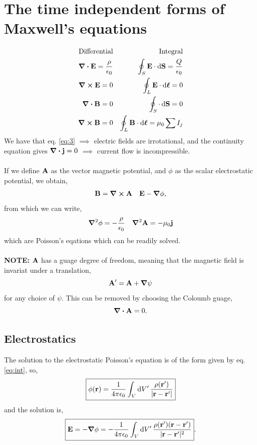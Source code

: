 \documentclass{book}
\begin{document}
\section{The time independent forms of Maxwell's equations}
\begin{align}
	\text{Differential} && \text{Integral}\\
	\div{\vb{E}} = \frac{\rho}{\epsilon_0} && \oint_S\vb{E}\cdot\dd{\vb{S}} = \frac{Q}{\epsilon_0} \label{eq:1} \\
	\curl{\vb{E}} = 0 && \oint_L \vb{E}\cdot\dd{\vb*{\ell}} = 0 \label{eq:2}\\
	\div{\vb{B}} = 0 && \oint_S \cdot\dd{\vb{S}} = 0 \label{eq:3}\\
	\curl{\vb{B}} = 0 && \oint_L\vb{B}\cdot\dd{\vb*{\ell}} = \mu_0 \sum I_j \label{eq:4}
\end{align}
We have that eq. \eqref{eq:3} $\implies$ electric fields are irrotational, and the continuity equation gives $\div{\vb{j}} = 0$ $\implies$ current flow is incompressible.
\\\\
If we define $\vb{A}$ as the vector magnetic potential, and $\phi$ as the scalar electrostatic potential, we obtain,
\begin{align}
	\vb{B} = \curl{\vb{A}} && \vb{E} - \grad \phi, \label{eq:potentials}
\end{align}
from which we can write,
\begin{align}
	\grad^2 \phi = -\frac{\rho}{\epsilon_0} && \grad^2 \vb{A} = -\mu_0\vb{j}
\end{align}
which are Poisson's eqations which can be readily solved.
\\\\
\textbf{NOTE:} $\vb{A}$ has a guage degree of freedom, meaning that the magnetic field is invariat under a translation,
\begin{equation}
	\vb{A}' = \vb{A} + \grad \psi
\end{equation}
for any choice of $\psi$. This can be removed by choosing the Coloumb guage,
\begin{equation}
	\div{\vb{A}} = 0.
\end{equation}
\subsection{Electrostatics}
The solution to the electrostatic Poisson's equation is of the form given by eq. \eqref{eq:int}, so,
\begin{equation}
	\boxed{\phi(\vb{r}) = \frac{1}{4\pi \epsilon_0}\int_{V}\dd{V'} \frac{\rho(\vb{r}')}{|\vb{r} - \vb{r}'|}}
\end{equation}
and the solution is,
\begin{equation}
	\begin{split}
	\boxed{\vb{E} = -\grad\phi = -\frac{1}{4\pi\epsilon_{0}} \int_V \dd{V'} \frac{\rho(\vb{r}')(\vb{r} - \vb{r}')}{|\vb{r} - \vb{r}'|^2}}.
	\end{split}
\end{equation}
\end{document}
